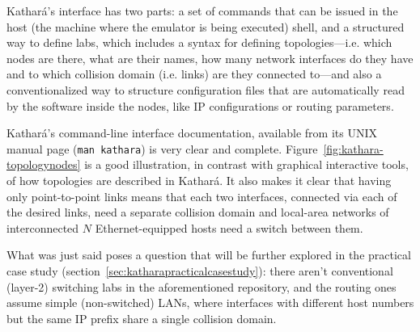 Kathará's interface has two parts: a set of commands that can be issued in the host (the machine where the emulator is being executed) shell, and a structured way to define labs, which includes a syntax for defining topologies---i.e. which nodes are there, what are their names, how many network interfaces do they have and to which collision domain (i.e. links) are they connected to---and also a conventionalized way to structure configuration files that are automatically read by the software inside the nodes, like IP configurations or routing parameters.

Kathará's command-line interface documentation, available from its UNIX manual page (\hbox{\texttt{man kathara}}) is very clear and complete.
Figure~\ref{fig:kathara-topologynodes} is a good illustration, in contrast with graphical interactive tools, of how topologies are described in Kathará.
It also makes it clear that having only point-to-point links means that each two interfaces, connected via each of the desired links, need a separate collision domain and local-area networks of interconnected $N$ Ethernet-equipped hosts need a switch between them.

What was just said poses a question that will be further explored in the practical case study (section~\ref{sec:katharapracticalcasestudy}): there aren't conventional (layer-2) switching labs in the aforementioned repository, and the routing ones assume simple (non-switched) LANs, where interfaces with different host numbers but the same IP prefix share a single collision domain.



